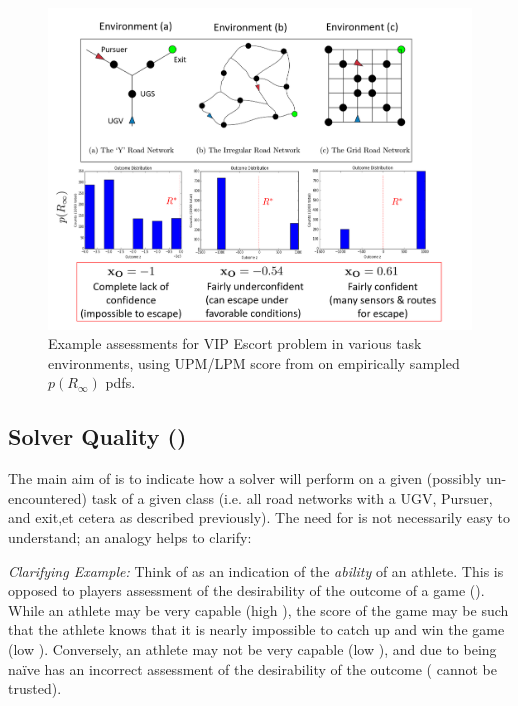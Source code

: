\begin{figure}[tbp]
    \centering
    \includegraphics[width=0.99\linewidth]{Figures/xO_envsOnly.png}
    \caption{Example \xO{} assessments for VIP Escort problem in various task environments, using UPM/LPM score from \cite{Aitken2016-cv} on empirically sampled $p(R_{\infty})$ pdfs.}
    \label{fig:xOexample}
\end{figure}


\subsection{Solver Quality (\xQ)} \label{sec:SQ}
    The main aim of \xQ{} is to indicate how a solver \solve{} will perform on a given (possibly un-encountered) task \task{} of a given class \taskclass{} (i.e. all road networks with a UGV, Pursuer, and exit,et cetera as described previously). The need for \xQ{} is not necessarily easy to understand; an analogy helps to clarify:
    
    \emph{Clarifying Example:} Think of \xQ{} as an indication of the \emph{ability} of an athlete. This is opposed to players assessment of the desirability of the outcome of a game (\xO). While an athlete may be very capable (high \xQ), the score of the game may be such that the athlete knows that it is nearly impossible to catch up and win the game (low \xO). Conversely, an athlete may not be very capable (low \xQ), and due to being na\"{i}ve has an incorrect assessment of the desirability of the outcome (\xO{} cannot be trusted).
    
